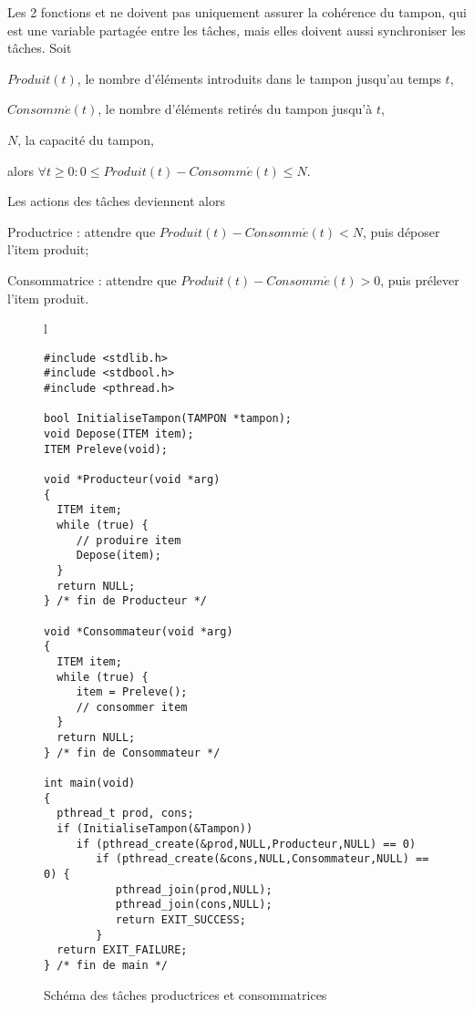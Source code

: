 Les 2 fonctions  et  ne doivent pas uniquement assurer la cohérence du tampon, qui est une variable partagée entre les tâches, mais elles doivent aussi synchroniser les tâches. Soit

\hspace{0.6cm}$Produit(t)$, le nombre d'éléments introduits dans le tampon jusqu'au temps $t$,

\hspace{0.6cm}$Consomm\acute{e}(t)$, le nombre d'éléments retirés du tampon jusqu'à $t$,

\hspace{0.6cm}$N$, la capacité du tampon,

alors $\forall t \geq 0: 0 \leq Produit(t) - Consomm\acute{e}(t) \leq N$.

Les actions des tâches deviennent alors

\hspace{0.6cm}Productrice : attendre que $Produit(t) - Consomm\acute{e}(t) < N$, puis déposer l'item produit;

\hspace{0.6cm}Consommatrice : attendre que $Produit(t) - Consomm\acute{e}(t) > 0$, puis prélever l'item produit.

\begin{figure}[t]

\begin{center}
\begin{tabular}{l}
\lstset{language=C++}
\begin{lstlisting}
#include <stdlib.h>
#include <stdbool.h>
#include <pthread.h>

bool InitialiseTampon(TAMPON *tampon);
void Depose(ITEM item);
ITEM Preleve(void);

void *Producteur(void *arg)
{
  ITEM item;
  while (true) {
     // produire item
     Depose(item);
  }
  return NULL;
} /* fin de Producteur */

void *Consommateur(void *arg)
{
  ITEM item;
  while (true) {
     item = Preleve();
     // consommer item
  }
  return NULL;
} /* fin de Consommateur */

int main(void)
{
  pthread_t prod, cons;
  if (InitialiseTampon(&Tampon))
     if (pthread_create(&prod,NULL,Producteur,NULL) == 0)
        if (pthread_create(&cons,NULL,Consommateur,NULL) == 0) {
           pthread_join(prod,NULL);
           pthread_join(cons,NULL);
           return EXIT_SUCCESS;
        }
  return EXIT_FAILURE;
} /* fin de main */
\end{lstlisting}
\end{tabular}
\caption{\label{prodcons:base}Schéma des tâches productrices et consommatrices}
\end{center}
\end{figure}

